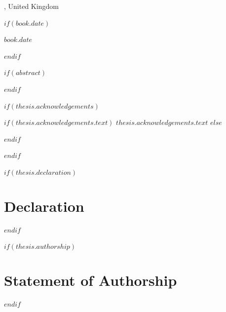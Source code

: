 \begin{titlepage}
\begin{center}
    {\large \univname, United Kingdom \par}

    \vspace{0.2cm}

    $if(book.date)$
    {\large $book.date$ \par}
    $endif$

  \end{center}
\end{titlepage}

\clearpage

$if(abstract)$
\begin{abstract}
\addchaptertocentry{\abstractname}
$abstract$
\end{abstract}
\clearpage
$endif$

$if(thesis.acknowledgements)$
\begin{acknowledgements}
\addchaptertocentry{\acknowledgementname}
$if(thesis.acknowledgements.text)$
$thesis.acknowledgements.text$
$else$

$endif$
\end{acknowledgements}
\clearpage
$endif$


$if(thesis.declaration)$
\chapter*{Declaration}

\clearpage
$endif$


$if(thesis.authorship)$
\chapter*{Statement of Authorship}

\clearpage
$endif$

